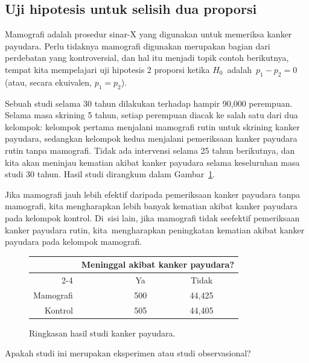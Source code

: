   
\subsection%
    {Uji hipotesis untuk selisih dua proporsi}


Mamografi adalah prosedur sinar-X yang digunakan untuk memeriksa
kanker payudara.
Perlu tidaknya mamografi digunakan merupakan bagian dari
perdebatan yang kontroversial, dan hal itu menjadi topik
contoh berikutnya, tempat kita mempelajari uji hipotesis
2 proporsi ketika $H_0$~adalah~$p_1 - p_2 = 0$
(atau, secara ekuivalen, $p_1 = p_2$).

Sebuah studi selama 30 tahun dilakukan terhadap hampir 90,000 perempuan. Selama masa skrining 5 tahun, setiap perempuan diacak ke salah satu dari dua kelompok: kelompok pertama menjalani mamografi rutin untuk skrining kanker payudara, sedangkan kelompok kedua menjalani pemeriksaan kanker payudara rutin tanpa mamografi. Tidak ada intervensi selama 25 tahun berikutnya, dan kita akan meninjau kematian akibat kanker payudara selama keseluruhan masa studi 30 tahun. Hasil studi dirangkum dalam Gambar~\ref{mammogramStudySummaryTable}.

Jika mamografi jauh lebih efektif daripada pemeriksaan kanker payudara tanpa mamografi, kita mengharapkan lebih banyak kematian akibat kanker payudara pada kelompok kontrol. Di~sisi lain, jika mamografi tidak seefektif pemeriksaan kanker payudara rutin, kita~mengharapkan peningkatan kematian akibat kanker payudara pada kelompok mamografi.

\begin{figure}[h]
\centering
\begin{tabular}{rrcc}
	& \multicolumn{3}{c}{Meninggal akibat kanker payudara?} \\
  \cline{2-4}
 & \ \hspace{3mm}\ & Ya & Tidak \\
  \hline
Mamografi && 500 & 44,425 \\
Kontrol && 505 & 44,405 \\
   \hline
\end{tabular}
\caption{Ringkasan hasil studi kanker payudara.}
\label{mammogramStudySummaryTable}
\end{figure}

\begin{exercisewrap}
\begin{nexercise}
Apakah studi ini merupakan eksperimen atau studi observasional?\footnotemark{}
\end{nexercise}
\end{exercisewrap}

